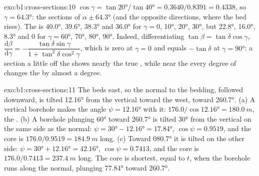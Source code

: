\begin{solution}{exo:b1:cross-sections:10}
$\cos\gamma = \tan\ang{20}/\tan\ang{40} = 0.3640/0.8391 = 0.4338$, so
$\gamma = \ang{64.3}$: the sections of  $\alpha \pm \ang{64.3}$
(and the opposite directions, where the bed rises). The  is
\ang{40.0}, \ang{39.6}, \ang{38.3} and \ang{36.0} for $\gamma = 0$, \ang{10},
\ang{20}, \ang{30}, but \ang{22.8}, \ang{16.0}, \ang{8.3} and $0$ for
$\gamma = \ang{60}$, \ang{70}, \ang{80}, \ang{90}. Indeed, differentiating
$\tan\beta = \tan\delta\cos\gamma$,
$\dfrac{\mathrm d\beta}{\mathrm d\gamma} =
-\dfrac{\tan\delta\sin\gamma}{1 + \tan^2\delta\cos^2\gamma}$, which is zero
at $\gamma = 0$ and equals $-\tan\delta$ at $\gamma = \ang{90}$: a section a
little off the  shows nearly the true , while near the 
every degree of  changes the  by almost a degree.
\end{solution}

\begin{solution}{exo:b1:cross-sections:11}
The beds  east, so the normal to the bedding, followed downward, is
tilted \ang{12.16} from the vertical toward the west, toward \ang{260.7}.
(a) A vertical borehole makes the angle $\psi = \ang{12.16}$ with it:
$176.0/\cos\ang{12.16} = \qty{180.0}{m}$, the . (b) A
borehole plunging \ang{60} toward \ang{260.7} is tilted \ang{30} from the
vertical on the same side as the normal: $\psi = \ang{30} - \ang{12.16} =
\ang{17.84}$, $\cos\psi = 0.9519$, and the core is $176.0/0.9519 =
\qty{184.9}{m}$ long. (c) Toward \ang{080.7} it is tilted on the other side:
$\psi = \ang{30} + \ang{12.16} = \ang{42.16}$, $\cos\psi = 0.7413$, and the
core is $176.0/0.7413 = \qty{237.4}{m}$ long. The core is shortest, equal to
$t$, when the borehole runs along the normal, plunging \ang{77.84} toward
\ang{260.7}.
\end{solution}

